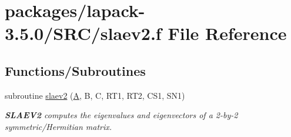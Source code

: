 \hypertarget{slaev2_8f}{}\section{packages/lapack-\/3.5.0/\+S\+R\+C/slaev2.f File Reference}
\label{slaev2_8f}
\subsection*{Functions/\+Subroutines}
\begin{DoxyCompactItemize}
\item 
subroutine \hyperlink{group__auxOTHERauxiliary_gaf79f0bb1a07a9d96b827eba946ec79fa}{slaev2} (\hyperlink{classA}{A}, B, C, R\+T1, R\+T2, C\+S1, S\+N1)
\begin{DoxyCompactList}\small\item\em {\bfseries S\+L\+A\+E\+V2} computes the eigenvalues and eigenvectors of a 2-\/by-\/2 symmetric/\+Hermitian matrix. \end{DoxyCompactList}\end{DoxyCompactItemize}
